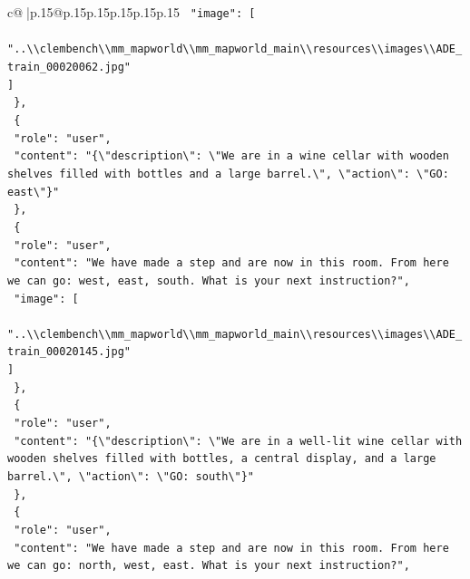 \documentclass{article}
\begin{document}
{\begin{supertabular}{c@{$\;$}|p{.15\linewidth}@{}p{.15\linewidth}p{.15\linewidth}p{.15\linewidth}p{.15\linewidth}p{.15\linewidth}}
{{{\texttt{    "image": {[}} \\
\texttt{      "..\textbackslash{}\textbackslash{}clembench\textbackslash{}\textbackslash{}mm\_mapworld\textbackslash{}\textbackslash{}mm\_mapworld\_main\textbackslash{}\textbackslash{}resources\textbackslash{}\textbackslash{}images\textbackslash{}\textbackslash{}ADE\_train\_00020062.jpg"} \\
\texttt{    {]}} \\
\texttt{  \},} \\
\texttt{  \{} \\
\texttt{    "role": "user",} \\
\texttt{    "content": "\{\textbackslash{}"description\textbackslash{}": \textbackslash{}"We are in a wine cellar with wooden shelves filled with bottles and a large barrel.\textbackslash{}", \textbackslash{}"action\textbackslash{}": \textbackslash{}"GO: east\textbackslash{}"\}"} \\
\texttt{  \},} \\
\texttt{  \{} \\
\texttt{    "role": "user",} \\
\texttt{    "content": "We have made a step and are now in this room. From here we can go: west, east, south. What is your next instruction?",} \\
\texttt{    "image": {[}} \\
\texttt{      "..\textbackslash{}\textbackslash{}clembench\textbackslash{}\textbackslash{}mm\_mapworld\textbackslash{}\textbackslash{}mm\_mapworld\_main\textbackslash{}\textbackslash{}resources\textbackslash{}\textbackslash{}images\textbackslash{}\textbackslash{}ADE\_train\_00020145.jpg"} \\
\texttt{    {]}} \\
\texttt{  \},} \\
\texttt{  \{} \\
\texttt{    "role": "user",} \\
\texttt{    "content": "\{\textbackslash{}"description\textbackslash{}": \textbackslash{}"We are in a well{-}lit wine cellar with wooden shelves filled with bottles, a central display, and a large barrel.\textbackslash{}", \textbackslash{}"action\textbackslash{}": \textbackslash{}"GO: south\textbackslash{}"\}"} \\
\texttt{  \},} \\
\texttt{  \{} \\
\texttt{    "role": "user",} \\
\texttt{    "content": "We have made a step and are now in this room. From here we can go: north, west, east. What is your next instruction?",} \\
}}}
\end{supertabular}}
\end{document}

